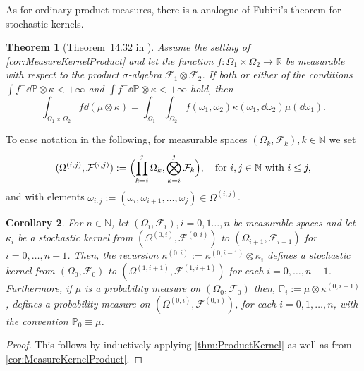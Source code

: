 \documentclass[
    a4paper,
    11pt,
    bibliography=totoc,
    listof=totoc,      
    headinclude=true,
    cleardoublepage=empty,
]{scrbook}
\theoremstyle{plain}
\newtheorem{theorem}{Theorem}[chapter]
\newtheorem{corollary}[theorem]{Corollary}
\theoremstyle{definition}
\theoremstyle{remark}
\newcommand{\SetR}{\mathbb R}
\newcommand{\SetN}{\mathbb N}
\newcommand{\PM}{\mathbb P}
\begin{document}
As for ordinary product measures, there is a analogue of Fubini's theorem for 
stochastic kernels. 
\begin{theorem}[Theorem~14.32 in \cite{klenke2020_ptcc}]
\label{thm:KernelFubini}
    Assume the setting of \cref{cor:MeasureKernelProduct} and let the function 
    $f:\Omega_1 \times \Omega_2 \to \overline{\SetR}$ be measurable with 
    respect to the product $\sigma$-algebra $\mathcal{F}_1 \otimes 
    \mathcal{F}_2$. If both or either of the conditions $\int f^+\dd{\PM\otimes\kappa}<+\infty$ and $\int f^-\dd{\PM\otimes\kappa}<+\infty$ hold, then
    \[
        \int_{\Omega_1\times\Omega_2} 
            f \dd{(\mu\otimes\kappa)}
        = \int_{\Omega_1} \int_{\Omega_2}
            f(\omega_1, \omega_2) 
            \kappa(\omega_1, \dd{\omega_2})
            \mu(\dd{\omega_1}).
    \]
\end{theorem}

To ease notation in the following, for measurable spaces $(\Omega_k, \mathcal{F}_k), k\in\SetN$ we set
\begin{equation}
\label{eq:ProductMeasurableSpaces}
    (\Omega^{(i,j)}, \mathcal{F}^{(i,j)}) := 
        \Bigl(
            \prod_{k=i}^{j}\Omega_k, \bigotimes_{k=i}^{j}\mathcal{F}_k
        \Bigr),
        \quad \text{for } i,j\in\SetN \text{ with } i\leq j,
\end{equation}
and with elements $\omega_{i:j}:=(\omega_i,\omega_{i+1},\dots,
\omega_j)\in\Omega^{(i,j)}$.

\begin{corollary}
\label{cor:NKernelProduct}
    For $n\in\SetN$, let $(\Omega_i, \mathcal{F}_i), i=0,1\dots,n$ be 
    measurable spaces and let $\kappa_i$ be a stochastic kernel from 
    $(\Omega^{(0,i)}, \mathcal{F}^{(0,i)})$ to $(\Omega_{i+1},
    \mathcal{F}_{i+1})$ for $i=0,\dots,n-1$. Then, the recursion 
    $\kappa^{(0,i)} := \kappa^{(0,i-1)}\otimes\kappa_i$
    defines a stochastic kernel from $(\Omega_0, \mathcal{F}_0)$ to 
    $(\Omega^{(1,i+1)}, \mathcal{F}^{(1,i+1)})$ for each $i=0,\dots,n-1$.
    Furthermore, if $\mu$ is a probability measure on $(\Omega_0, 
    \mathcal{F}_0)$ then, $\PM_i:= \mu\otimes\kappa^{(0,i-1)}$,
    defines a probability measure on $(\Omega^{(0,i)}, \mathcal{F}^{(0,i)})$,
    for each $i=0,1,\dots,n$, with the convention $\PM_0 \equiv \mu$.
\end{corollary}
\begin{proof}
    This follows by inductively applying \cref{thm:ProductKernel}
    as well as from \cref{cor:MeasureKernelProduct}.
\end{proof}
\end{document}
